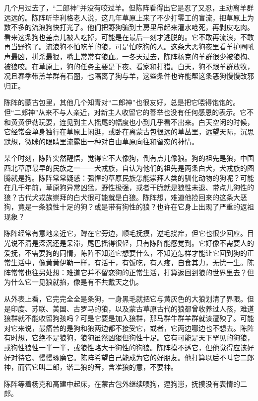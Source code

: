 \par 几个月过去了，“二郎神”并没有咬过羊。但陈阵看得出它是忍了又忍，主动离羊群远远的。陈阵听毕利格老人说，这几年草原上来了不少打零工的盲流，把草原上为数不多的流浪狗快打光了。他们把野狗骗到土房里吊起来灌水呛死，再剥皮吃肉。看来这条狗也差点儿被人吃掉，可能是在最后一刻才逃脱的。它不敢再流浪，不敢再当野狗了。流浪狗不怕吃羊的狼，可是怕吃狗的人。这条大恶狗夜里看羊护圈吼声最凶，拼杀最狠，嘴上常常有狼血。一冬天过去，陈阵杨克的羊群很少被狼掏、被狼咬。在草原上，狗的任务主要是下夜、看家和打猎。白天，狗不跟羊群放牧，况且春季带羔羊群有石圈，也隔离了狗与羊，这些条件也许能帮这条恶狗慢慢改邪归正。
\par 陈阵的蒙古包里，其他几个知青对“二郎神”也很友好，总是把它喂得饱饱的。但“二郎神”从来不与人亲近，对新主人收留它的善举也没有任何感恩的表示。它不和黄黄伊勒玩耍，连见到主人摇尾的幅度也小到几乎看不出来。白天空闲的时候，它经常会单身独行在草原上闲逛，或卧在离蒙古包很远的草丛里，远望天际，沉思默想，微眯的眼睛里流露出一种对自由草原向往和留恋的神情。
\par 某个时刻，陈阵突然醒悟，觉得它不大像狗，倒有点儿像狼。狗的祖先是狼，中国西北草原最早的民族之一——犬戎族，自认为他们的祖先是两条白犬，犬戎族的图腾就是狗。陈阵常常疑惑：强悍的草原民族怎能崇拜人类的驯化动物的狗呢？可能在几千年前，草原狗异常凶猛，野性极强，或者干脆就是狼性未退、带点儿狗性的狼？古代犬戎族崇拜的白犬很可能就是白狼。陈阵想，难道他捡回来的这条大恶狗，竟是一条狼性十足的狗？或是带有狗性的狼？也许在它身上出现了严重的返祖现象？
\par 陈阵经常有意地亲近它，蹲在它旁边，顺毛抚摸，逆毛挠痒，但它也很少回应。目光说不清是深沉还是呆滞，尾巴摇得很轻，只有陈阵能感觉到。它好像不需要人的爱抚，不需要狗的同情，陈阵不知道它想要什么，不知道怎样才能让它回到狗的正常生活中，像黄黄伊勒一样，有活干，有饭吃，有人疼，自食其力，无忧一生。陈阵常常也往另处想：难道它并不留恋狗的正常生活，打算返回到狼的世界里去？但为什么它一见狼就掐，像是有不共戴天之仇。
\par 从外表上看，它完完全全是条狗，一身黑毛就把它与黄灰色的大狼划清了界限。但是印度、苏联、美国、古罗马的狼，以及蒙古草原古代的狼都曾收养过人孩，难道狼群就不能收留狗孩吗？可是它要是加入狼群，那马群牛群羊群就该遭殃了。可能对它来说，最痛苦的是狗和狼两边都不接受它，或者，它两边哪边也不想去。陈阵有时想，它绝不是狼狗，狼狗虽然凶狠但狗性十足。它有可能是天下罕见的狗狼，或狗性狼性一半一半，或狼性略大于狗性的狗狼。陈阵摸不透它，但他觉得应该好好对待它、慢慢琢磨它。陈阵希望自己能成为它的好朋友。他打算以后不叫它二郎神，而管它叫二郎，谐二狼的音，含准狼的意，不要神。
\par 陈阵等着杨克和高建中起床，在蒙古包外继续喂狗，逗狗崽，抚摸没有表情的二郎。
